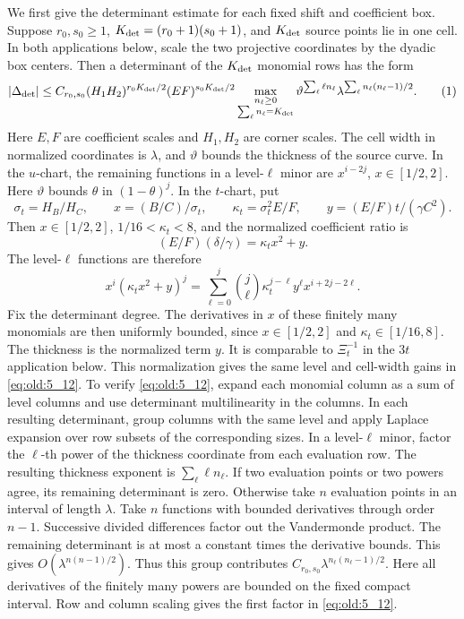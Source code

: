 We first give the determinant estimate for each fixed shift and
coefficient box. Suppose \(r_0,s_0\ge1\),
\(K_{\rm det}=(r_0+1)(s_0+1)\), and
\(K_{\rm det}\) source points lie in one cell. In both applications below, scale
the two projective coordinates by the dyadic box centers. Then a determinant
of the \(K_{\rm det}\) monomial rows has the form
\[
 |\Delta_{\rm det}|\le C_{r_0,s_0}(H_1H_2)^{r_0K_{\rm det}/2}(EF)^{s_0K_{\rm det}/2}
 \max_{\substack{n_\ell\ge0\\\sum_\ell n_\ell=K_{\rm det}}}
 \vartheta^{\sum_\ell \ell n_\ell}
 \lambda^{\sum_\ell n_\ell(n_\ell-1)/2}.
\AutoTag{eq:old:5_12}
\]
Here \(E,F\) are coefficient scales and \(H_1,H_2\) are corner scales.
The cell width in normalized coordinates is
\(\lambda\), and \(\vartheta\) bounds the thickness of the source curve.
In the \(u\)-chart, the remaining functions in a level-\(\ell\) minor are
\(x^{i-2j}\), \(x\in[1/2,2]\). Here
\(\vartheta\) bounds \(\theta\) in \((1-\theta)^j\). In the \(t\)-chart,
put
\[
 \sigma_t=H_B/H_C,\qquad x=(B/C)/\sigma_t,\qquad
 \kappa_t=\sigma_t^2E/F,\qquad y=(E/F)t/(\gamma C^2).
\]
Then \(x\in[1/2,2]\), \(1/16<\kappa_t<8\), and the normalized
coefficient ratio is
\[
 (E/F)(\delta/\gamma)=\kappa_t x^2+y.
\]
The level-\(\ell\) functions are therefore
\[
 x^i(\kappa_t x^2+y)^j
 =\sum_{\ell=0}^j\binom j\ell\kappa_t^{j-\ell}y^\ell
     x^{i+2j-2\ell}.
\]
Fix the determinant degree. The derivatives in \(x\) of these
finitely many monomials are then uniformly bounded, since \(x\in[1/2,2]\)
and \(\kappa_t\in[1/16,8]\). The thickness is the normalized term \(y\).
It is comparable to \(\Xi_t^{-1}\) in the \(3t\) application below.
This normalization gives the same level and cell-width gains in \eqref{eq:old:5_12}.
To verify \eqref{eq:old:5_12}, expand each monomial column as a sum of
level columns and use determinant multilinearity in the columns. In each
resulting determinant, group columns with the same level and apply Laplace
expansion over row subsets of the corresponding sizes. In a level-\(\ell\)
minor, factor the \(\ell\)-th power of the thickness coordinate from each
evaluation row. The resulting thickness exponent is \(\sum_\ell \ell n_\ell\).
If two evaluation points or two powers agree,
its remaining determinant is zero. Otherwise take \(n\) evaluation points
in an interval of length \(\lambda\). Take \(n\) functions with bounded
derivatives through order \(n-1\). Successive divided differences factor
out the Vandermonde product. The remaining determinant is at most a
constant times the derivative bounds. This gives
\(O(\lambda^{n(n-1)/2})\). Thus this group contributes
\(C_{r_0,s_0}\lambda^{n_\ell(n_\ell-1)/2}\). Here all derivatives of
the finitely many powers are bounded on the fixed compact interval. Row
and column scaling gives the first factor in \eqref{eq:old:5_12}.


